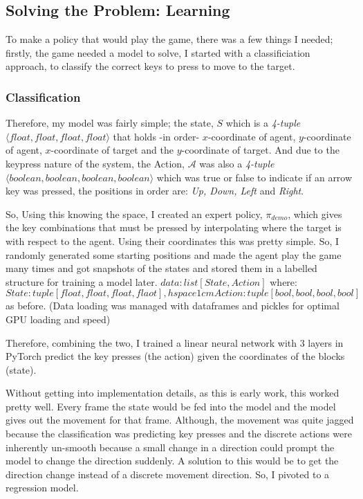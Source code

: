 \subsection{Solving the Problem: Learning}
To make a policy that would play the game, there was a few things I needed; firstly, the game needed a model to solve, I started with a classificiation approach, to classify the correct keys to press to move to the target.


\subsubsection{Classification}
Therefore, my model was fairly simple; the state, $S$ which is a \emph{4-tuple} $\langle float, float, float, float \rangle$ that holds -in order- $x$-coordinate of agent, $y$-coordinate of agent, $x$-coordinate of target and the $y$-coordinate of target. And due to the keypress nature of the system, the Action, $\mathcal{A}$ was also a \emph{4-tuple} $\langle boolean, boolean, boolean, boolean \rangle$ which was true or false to indicate if an arrow key was pressed, the positions in order are: \emph{Up, Down, Left} and \emph{Right}.

So, Using this knowing the space, I created an expert policy, \(\pi_{demo}\), which gives the key combinations that must be pressed by interpolating where the target is with respect to the agent. Using their coordinates this was pretty simple. So, I randomly generated some starting positions and made the agent play the game many times and got snapshots of the states and stored them in a labelled structure for training a model later. \(data: list\left[State, Action\right]\) where:
\[
  State: tuple\left[float, float, float, flaot\right], 
  hspace{1cm} Action: tuple\left[bool, bool, bool, bool\right]
\]
as before. (Data loading was managed with dataframes and pickles for optimal GPU loading and speed)

Therefore, combining the two, I trained a linear neural network with 3 layers in PyTorch \cite{pytorch} predict the key presses (the action) given the coordinates of the blocks (state).

Without getting into implementation details, as this is early work, this worked pretty well. Every frame the state would be fed into the model and the model gives out the movement for that frame. Although, the movement was quite jagged because the classification was predicting key presses and the discrete actions were inherently un-smooth because a small change in a direction could prompt the model to change the  direction suddenly. A solution to this would be to get the direction change instead of a discrete movement direction. So, I pivoted to a regression model.

